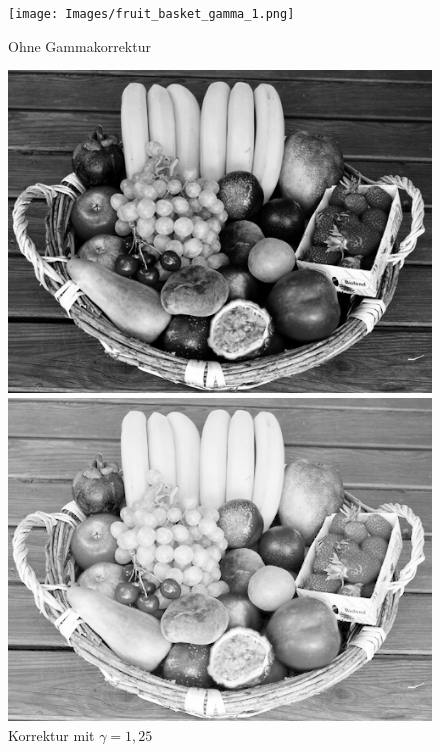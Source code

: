 \documentclass[course=erap]{aspdoc}
\begin{document}
	\begin{figure}[h]
		\begin{minipage}{0.49\linewidth}
			\centering
			\texttt{[image: Images/fruit\_basket\_gamma\_1.png]}
			\caption{Ohne Gammakorrektur}
			\label{ObstkorbGamma1}
		\end{minipage}
		\centering
		\begin{minipage}{0.49\linewidth}
			\centering
			\includegraphics[scale=1.2]{Images/fruit_basket_gamma_1,25.png}
			\caption{Korrektur mit $\gamma = 1,25$}
			\label{ObstkorbGamma1_25}
		\end{minipage}
		\begin{minipage}{0.49\linewidth}
			\centering
			\includegraphics[scale=1.2]{Images/fruit_basket_gamma_0,5.png}

\end{minipage}
\end{figure}
\end{document}
